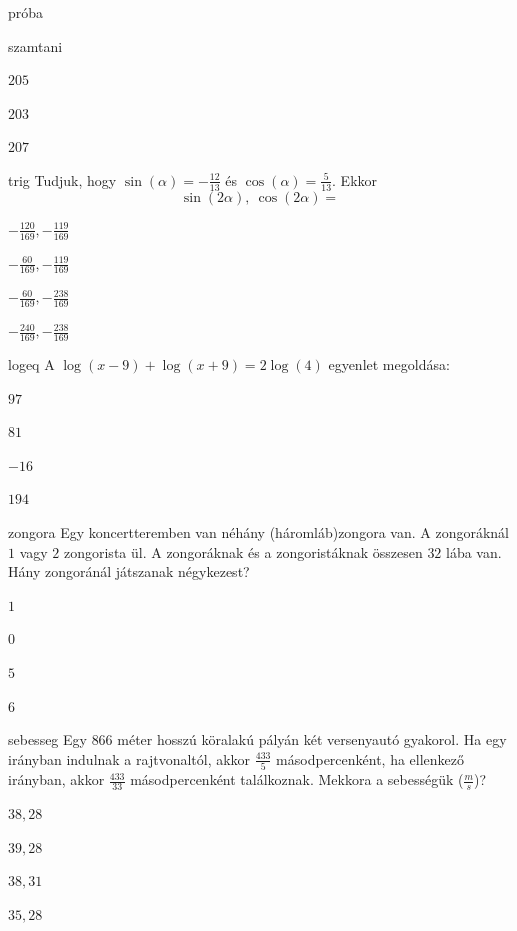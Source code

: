 \documentclass[12pt]{article}
\begin{document}
\begin{quiz}{próba}
\begin{multi}{szamtani}
\item  $205$
\item  $203$
\item  $207$
\end{multi}
\begin{multi}{trig}
Tudjuk, hogy $ \sin(\alpha) =-\frac{12}{13}$ és $ \cos(\alpha) = \frac{5}{13} $. 
Ekkor $$ \sin(2\alpha),\ \cos(2\alpha)=$$
\item* $ -\frac{120}{169}, -\frac{119}{169} $
\item  $ -\frac{60}{169}, -\frac{119}{169} $
\item  $ -\frac{60}{169}, -\frac{238}{169} $
\item  $ -\frac{240}{169}, -\frac{238}{169} $
\end{multi}
\begin{multi}{logeq}
A $ \log(x-9)+\log(x+9)=2\log(4) $ egyenlet megoldása:
\item* $ 97  $
\item  $ 81 $
\item  $ -16 $
\item  $ 194 $
\end{multi}
\begin{multi}{zongora}
Egy koncertteremben van néhány (háromláb)zongora van. A zongoráknál 
$1$ vagy $2$ zongorista ül. A zongoráknak és a zongoristáknak összesen $32$ 
lába van. Hány zongoránál játszanak négykezest?
\item* $ 1  $
\item  $ 0 $
\item  $ 5 $
\item  $ 6 $
\end{multi}
\begin{multi}{sebesseg}
Egy $866$ méter hosszú köralakú pályán két versenyautó gyakorol. Ha egy irányban 
indulnak a rajtvonaltól, akkor $\frac{433}{5}$ másodpercenként, ha ellenkező irányban, akkor 
$\frac{433}{33}$ másodpercenként találkoznak. Mekkora a sebességük ($\frac{m}{s}$)?
\item* $ 38, 28  $
\item  $ 39, 28 $
\item  $ 38, 31 $
\item  $ 35, 28 $
\end{multi}
\end{quiz}
\end{document}
